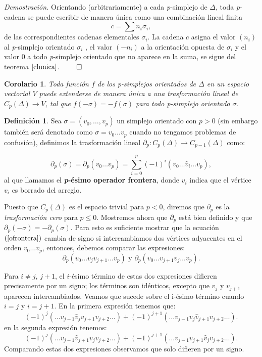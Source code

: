 \documentclass[12pt]{book}
\newtheorem{corollary}[theorem]{Corolario}
\theoremstyle{definition}
\newtheorem{definition}[theorem]{Definición}
\newcounter{in}
\newcounter{ini}
\begin{document}
\textit{Demostración.} Orientando (arbitrariamente) a cada
\emph{p}-simplejo de $\Delta$, toda \emph{p}-cadena se puede escribir
de manera única como una combinación lineal finita
$$c=\sum n_{i}\sigma_{i},$$
de las correspondientes cadenas elementales $\sigma_{i}$. La
cadena $c$ asigna el valor $(n_{i})$ al \emph{p}-simplejo orientado
$\sigma_{i}$ , el valor $(-n_{i})$ a la orientación opuesta de
$\sigma_{i}$ y el valor $0$ a todo \emph{p}-simplejo orientado que no
aparece en la suma, se sigue del teorema $\ref{clunica}$. $\qed$

\begin{corollary}
  Toda función $f$ de los p-simplejos orientados de $\Delta$ en
  un espacio vectorial $V$ puede extenderse de manera única a una
  trasformación lineal de $C_{p}(\Delta)\rightarrow V$, tal que $f(-
  \sigma)=-f(\sigma)$ para todo p-simplejo orientado $\sigma$.
\end{corollary}

\begin{definition}
  Sea $\sigma=(v_{0},\ldots ,v_{p})$ un simplejo orientado con $p>0$
  (sin embargo también será denotado como $\sigma=v_{0}\ldots v_{p}$
  cuando no tengamos problemas de confusión),
  definimos la trasformación lineal $\partial_{p}:C_{p}(\Delta)\rightarrow
  C_{p-1}(\Delta)$ como:

  \begin{equation}
    \label{ofrontera}
    \partial_{p}(\sigma)=\partial_{p}(v_{0}\ldots
    v_{p})=\sum^{p}_{i=0}(-1)^{i}(v_{0}\ldots \widehat v_{i}\ldots v_{p}),
  \end{equation}
  al que llamamos el \textbf{\emph{p}-ésimo operador frontera}, donde
  $\widehat v_{i}$ indica que el vértice $v_{i}$ es borrado del arreglo.
\end{definition}

Puesto que $C_{p}(\Delta)$ es el espacio trivial para $p<0$, diremos
que $\partial_{p}$ es la \textit{trasformación cero} para $p\leq
0$. Mostremos ahora que $\partial_{p}$ está bien definido y que
$\partial_{p}(-\sigma)=-\partial_{p}(\sigma)$. Para esto es suficiente
mostrar que la ecuación $(\ref{ofrontera})$ cambia de signo si intercambiamos dos
vértices adyacentes en el orden $v_{0}\ldots v_{p}$, entonces,
debemos comparar las expresiones:
$$\partial_{p}(v_{0}\ldots v_{j} v_{j+1} \ldots v_{p}) \mbox{ y } \partial_{p}(v_{0}\ldots v_{j+1} v_{j} \ldots v_{p}).$$

Para $i\neq j$, $j+1$, el $i$-ésimo término de estas dos expresiones
difieren precisamente por un signo; los términos son idénticos,
excepto que $v_{j}$ y $v_{j+1}$ aparecen intercambiados. Veamos que
sucede sobre el i-ésimo término cuando $i=j$ y $i=j+1$. En la primera
expresión tenemos que:
$$(-1)^{j}(\ldots v_{j-1} \widehat v_{j}v_{j+1}v_{j+2}\ldots)+(-1)^{j+1}(\ldots v_{j-1}v_{j}\widehat v_{j+1}v_{j+2}\ldots).$$
en la segunda expresión tenemos:
$$(-1)^{j}(\ldots v_{j-1}\widehat v_{j+1}v_{j}v_{j+2}\ldots)+(-1)^{j+1}(\ldots v_{j-1}v_{j+1}\widehat v_{j}v_{j+2}\ldots).$$
Comparando estas dos expresiones observamos que solo difieren por un signo.
\end{document}
